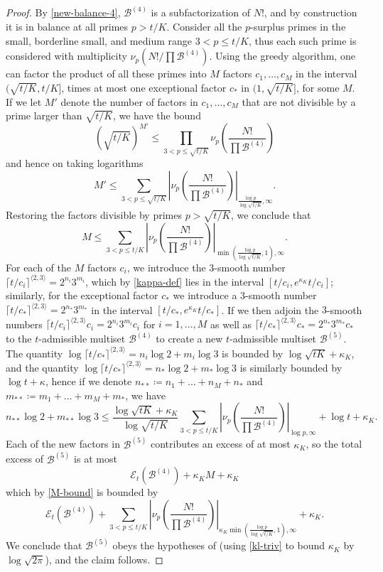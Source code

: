 \documentclass[12pt,a4paper,reqno]{amsart}
\numberwithin{equation}{section}
\theoremstyle{plain}
\theoremstyle{definition}
\newcommand\tuple{{\mathcal B}}
\newcommand\excess{{\mathcal{E}}}
\begin{document}
\begin{proof} By \eqref{new-balance-4}, $\tuple^{(4)}$ is a subfactorization of $N!$, and by construction it is in balance at all primes $p>t/K$. Consider all the $p$-surplus primes in the small, borderline small, and medium range $3 < p \leq t/K$, thus each such prime is considered with multiplicity $\nu_p(N!/\prod \tuple^{(4)})$.  
Using the greedy algorithm, one can factor the product of all these primes into $M$ factors $c_1,\dots,c_M$ in the interval $(\sqrt{t/K}, t/K]$, times at most one exceptional factor $c_*$ in $(1,\sqrt{t/K}]$, for some $M$.  If we let $M'$ denote the number of factors in $c_1,\dots,c_M$ that are not divisible by a prime larger than $\sqrt{t/K}$, we have the bound
$$ \left(\sqrt{t/K}\right)^{M'} \leq
\prod_{3 < p \leq \sqrt{t/K}} \nu_p\left(\frac{N!}{\prod \tuple^{(4)}}\right)$$
and hence on taking logarithms
$$
M' \leq \sum_{3 < p \leq \sqrt{t/K}}
\left|\nu_p\left(\frac{N!}{\prod \tuple^{(4)}}\right)\right|_{\frac{\log p}{\log\sqrt{t/K}},\infty}. 
$$
Restoring the factors divisible by primes $p > \sqrt{t/K}$, we conclude that 
\begin{equation}\label{M-bound}  M \leq \sum_{3 < p \leq t/K}
\left|\nu_p\left(\frac{N!}{\prod \tuple^{(4)}}\right)\right|_{\min(\frac{\log p}{\log\sqrt{t/K}},1),\infty}. \end{equation}
For each of the $M$ factors $c_i$, we introduce the $3$-smooth number $\lceil t/c_i\rceil^{\langle 2,3\rangle} = 2^{n_i} 3^{m_i}$, which by \eqref{kappa-def} lies in the interval $[t/c_i,e^{\kappa_K} t/c_i]$; similarly, for the exceptional factor $c_*$ we introduce a $3$-smooth number $\lceil t/c_* \rceil^{\langle 2,3 \rangle} = 2^{n_*} 3^{m_*}$ in the interval $[t/c_*,e^{\kappa_K} t/c_*]$.  If we then adjoin the $3$-smooth numbers $\lceil t/c_i\rceil^{\langle 2,3\rangle} c_i = 2^{n_i} 3^{m_i} c_i$ for $i=1,\dots,M$ as well as $\lceil t/c_*\rceil^{\langle 2,3\rangle} c_* = 2^{n_*} 3^{m_*} c_*$ to the $t$-admissible multiset $\tuple^{(4)}$ to create a new $t$-admissible multiset $\tuple^{(5)}$.  The quantity $\log \lceil t/c_*\rceil^{\langle 2,3\rangle} = n_i \log 2 + m_i \log 3$ is bounded by $\log \sqrt{tK} + \kappa_K$, and the quantity $\log \lceil t/c_*\rceil^{\langle 2,3\rangle}  = n_* \log 2 + m_* \log 3$ is similarly bounded by $\log t + \kappa$, hence if we denote $n_{**} \coloneqq n_1 + \dots + n_M + n_*$ and $m_{**} \coloneqq m_1 + \dots + m_M + m_*$, we have
$$ n_{**} \log 2 + m_{**} \log 3 \leq 
\frac{\log \sqrt{tK} + \kappa_K}{\log\sqrt{t/K}}
\sum_{3 < p \leq t/K}
\left|\nu_p\left(\frac{N!}{\prod \tuple^{(4)}}\right)\right|_{\log p,\infty}
+ \log t + \kappa_K.$$
Each of the new factors in $\tuple^{(5)}$ contributes an excess of at most $\kappa_K$, so the total excess of $\tuple^{(5)}$ is at most
$$ \excess_t(\tuple^{(4)}) + \kappa_K M + \kappa_K$$
which by \eqref{M-bound} is bounded by
$$ \excess_t(\tuple^{(4)}) + \sum_{3 < p \leq t/K}
\left|\nu_p\left(\frac{N!}{\prod \tuple^{(4)}}\right)\right|_{\kappa_K \min(\frac{\log p}{\log\sqrt{t/K}},1),\infty} + \kappa_K.$$
We conclude that $\tuple^{(5)}$ obeys the hypotheses of  (using \eqref{kl-triv} to bound $\kappa_K$ by $\log \sqrt{2\pi}$), and the claim follows.
\end{proof}
\end{document}
